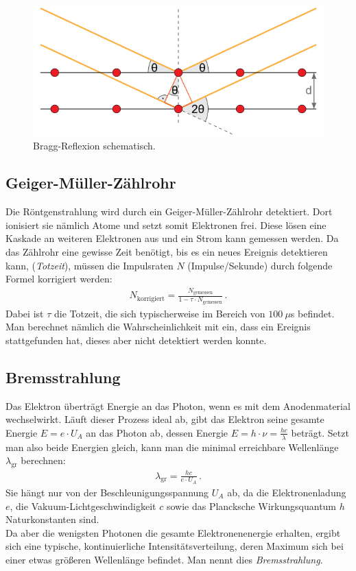 \documentclass[12pt,a4paper,titlepage,headinclude,bibtotoc]{scrartcl}
\begin{document}
\begin{figure}[!h]
	\centering
	\includegraphics[scale=0.7]{Bragg.png}
	\caption{Bragg-Reflexion schematisch. \cite[Datum: 02.01.15]{LP23}}
	\label{fig:Bragg}
\end{figure}

\subsection{Geiger-Müller-Zählrohr}
Die Röntgenstrahlung wird durch ein Geiger-Müller-Zählrohr detektiert.
Dort ionisiert sie nämlich Atome und setzt somit Elektronen frei.
Diese lösen eine Kaskade an weiteren Elektronen aus und ein Strom kann gemessen werden.
Da das Zählrohr eine gewisse Zeit benötigt, bis es ein neues Ereignis detektieren kann, (\emph{Totzeit}), müssen die Impulsraten $N$ (Impulse/Sekunde) durch folgende Formel korrigiert werden:
\begin{align}
	N_\text{korrigiert}=\frac{N_\text{gemessen}}{1-\tau\cdot N_\text{gemessen}}\,.
\end{align}
Dabei ist $\tau$ die Totzeit, die sich typischerweise im Bereich von $100 ~ \mu$s befindet.
Man berechnet nämlich die Wahrscheinlichkeit mit ein, dass ein Ereignis stattgefunden hat, dieses aber nicht detektiert werden konnte.

\subsection{Bremsstrahlung}
Das Elektron überträgt Energie an das Photon, wenn es mit dem Anodenmaterial wechselwirkt.
Läuft dieser Prozess ideal ab, gibt das Elektron seine gesamte Energie $E=e\cdot U_A$ an das Photon ab, dessen Energie $E=h\cdot \nu=\frac{hc}{\lambda}$ beträgt.
Setzt man also beide Energien gleich, kann man die minimal erreichbare Wellenlänge $\lambda_\text{gr}$ berechnen:
\begin{align}
	\lambda_\text{gr}=\frac{hc}{e \cdot U_A}\,.
	\label{eq:grenzLambda}
\end{align}
Sie hängt nur von der Beschleunigungsspannung $U_A$ ab, da die Elektronenladung $e$, die Vakuum-Lichtgeschwindigkeit $c$ sowie das Plancksche Wirkungsquantum $h$ Naturkonstanten sind.\\
Da aber die wenigsten Photonen die gesamte Elektronenenergie erhalten, ergibt sich eine typische, kontinuierliche Intensitätsverteilung, deren Maximum sich bei einer etwas größeren Wellenlänge befindet.
Man nennt dies \emph{Bremsstrahlung}.
\end{document}
